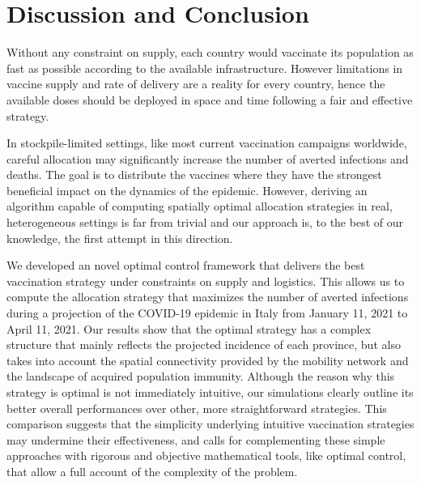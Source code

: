 
\section{Discussion and Conclusion}
Without any constraint on supply, each country would vaccinate its population as fast as possible according to the available infrastructure. However limitations in vaccine supply and rate of delivery are a reality for every country, hence the available doses should be deployed in space and time following a fair and effective strategy. 

In stockpile-limited settings, like most current vaccination campaigns worldwide, careful allocation may significantly increase the number of averted infections and deaths. The goal is to distribute the vaccines where they have the strongest beneficial impact on the dynamics of the epidemic. However, deriving an algorithm capable of computing spatially optimal allocation strategies in real, heterogeneous settings is far from trivial and our approach is, to the best of our knowledge, the first attempt in this direction. 

We developed an novel optimal control framework that delivers the best vaccination strategy under constraints on supply and logistics. This allows us to compute the allocation strategy that maximizes the number of averted infections during a projection of the COVID-19 epidemic in Italy from January 11, 2021 to April 11, 2021. Our results show that the optimal strategy has a complex structure that mainly reflects the projected incidence of each province, but also takes into account the spatial connectivity provided by the mobility network and the landscape of acquired population immunity. Although the reason why this strategy is optimal is not immediately intuitive, our simulations clearly outline its better overall performances over other, more straightforward strategies. This comparison suggests that the simplicity underlying intuitive vaccination strategies may undermine their effectiveness, and calls for complementing these simple approaches with rigorous and objective mathematical tools, like optimal control, that allow a full account of the complexity of the problem.

